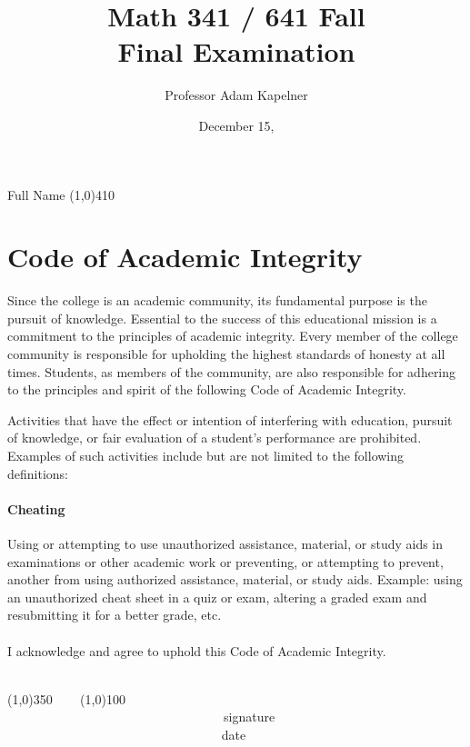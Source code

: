 \documentclass[12pt]{article}
\title{Math 341 / 641 Fall \the\year{} \\ Final Examination \inred{Solutions}}
\author{Professor Adam Kapelner}
\date{December 15, \the\year{}}
\begin{document}
\maketitle

\noindent Full Name \line(1,0){410}

\thispagestyle{empty}

\section*{Code of Academic Integrity}

\footnotesize
Since the college is an academic community, its fundamental purpose is the pursuit of knowledge. Essential to the success of this educational mission is a commitment to the principles of academic integrity. Every member of the college community is responsible for upholding the highest standards of honesty at all times. Students, as members of the community, are also responsible for adhering to the principles and spirit of the following Code of Academic Integrity.

Activities that have the effect or intention of interfering with education, pursuit of knowledge, or fair evaluation of a student's performance are prohibited. Examples of such activities include but are not limited to the following definitions:

\paragraph{Cheating} Using or attempting to use unauthorized assistance, material, or study aids in examinations or other academic work or preventing, or attempting to prevent, another from using authorized assistance, material, or study aids. Example: using an unauthorized cheat sheet in a quiz or exam, altering a graded exam and resubmitting it for a better grade, etc.\\
\\
\noindent I acknowledge and agree to uphold this Code of Academic Integrity. \\~\\

\begin{center}
\line(1,0){350} ~~~ \line(1,0){100}\\
~~~~~~~~~~~~~~~~~~~~~~~~~~~~~~~~~~signature~~~~~~~~~~~~~~~~~~~~~~~~~~~~~~~~~~~~~~~~~~~~~~~~~~~~~~~~~~~~~~ date
\end{center}

\normalsize
\end{document}
